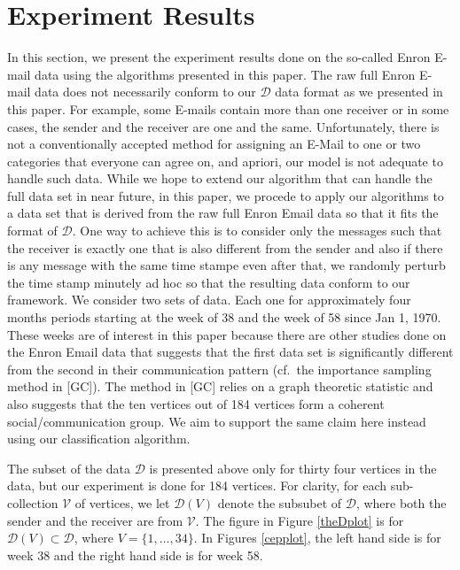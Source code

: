 \documentclass[12pt]{article}%
\begin{document}
\section{Experiment Results}
In this section, we present the experiment results done on the so-called Enron E-mail data using the algorithms 
presented in this paper.  The raw full Enron E-mail data does not necessarily conform to our $\mathcal D$ data 
format as we presented in this paper.  For example, some E-mails contain more than one receiver or in some cases, 
the sender and the receiver are one and the same.  Unfortunately, there is not a conventionally accepted method for 
assigning an E-Mail to one or two categories that everyone can agree on, and apriori, our model is not adequate to
handle such data.  While we hope to extend our algorithm that can handle the full data set in near future, in this
paper, we procede to apply our algorithms to a data set that is derived from the raw full Enron Email data so that 
it fits the format of $\mathcal D$.  One way to achieve this is to consider only the messages such that 
the receiver is exactly one that is also different from the sender and also if there is any message with 
the same time stampe even after that, we randomly perturb the time stamp minutely ad hoc so that the resulting data conform
to our framework.  We consider two sets of data.  Each one for approximately four months periods starting at the week of 38 and the week of 58 since Jan 1, 1970.  These weeks are of interest in this paper because there are other studies done on the Enron Email data that suggests that the first data set is significantly different from the second in their communication pattern (cf.\ the importance sampling method in [GC]).  The method in [GC] relies on a graph theoretic statistic 
and also suggests that the ten vertices out of 184 vertices form a coherent social/communication group.   
We aim to support the same claim here instead using our classification algorithm.  

The subset of the data $\mathcal D$ is presented above only for thirty four vertices in the data, but our experiment is done for 184 vertices.  For clarity, for each sub-collection $\mathcal V$ of vertices, 
we let $\mathcal D(V)$ denote the subsubet of $\mathcal D$, where both the sender and the receiver are from $\mathcal V$. The figure in Figure \ref{theDplot} is for $\mathcal D(V) \subset \mathcal D$, where $V = \{1,\ldots,34\}$.  In  Figures \ref{cepplot}, the left hand side is for week 38 and the right hand side is for week 58.
\end{document}
